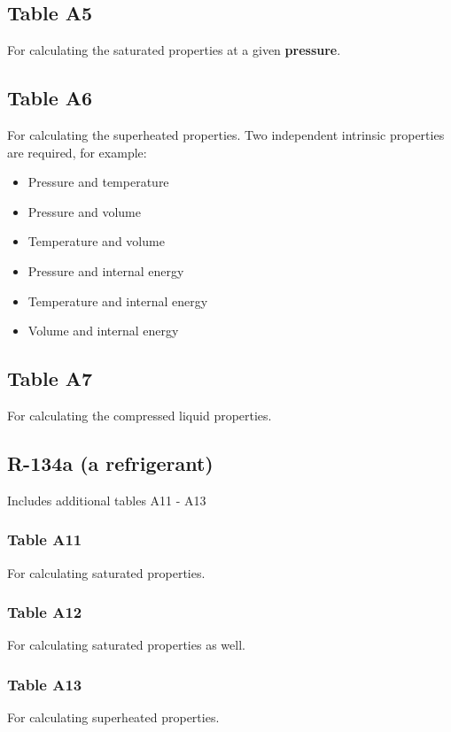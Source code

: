 \documentclass[11pt]{article}
\begin{document}
\subsection{Table A5}
\label{sec:org131be16}
For calculating the saturated properties at a given \textbf{pressure}.

\subsection{Table A6}
\label{sec:org93879d1}
For calculating the superheated properties. Two independent intrinsic properties are required, for example:
\begin{itemize}
\item Pressure and temperature
\item Pressure and volume
\item Temperature and volume
\item Pressure and internal energy
\item Temperature and internal energy
\item Volume and internal energy
\end{itemize}

\subsection{Table A7}
\label{sec:org2b837d3}
For calculating the compressed liquid properties.

\subsection{R-134a (a refrigerant)}
\label{sec:orgd1c8b01}
Includes additional tables A11 - A13

\subsubsection{Table A11}
\label{sec:org04718c4}
For calculating saturated properties.

\subsubsection{Table A12}
\label{sec:orgc42617a}
For calculating saturated properties as well.

\subsubsection{Table A13}
\label{sec:orgaa28dca}
For calculating superheated properties.
\end{document}
